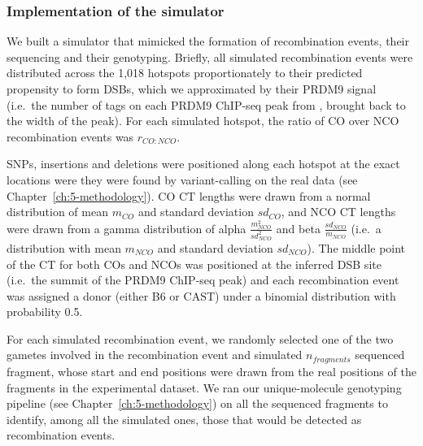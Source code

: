 


\subsubsection{Implementation of the simulator}
We built a simulator that mimicked the formation of recombination events, their sequencing and their genotyping.
Briefly, all simulated recombination events were distributed across the 1,018 hotspots proportionately to their predicted propensity to form DSBs, which we approximated by their PRDM9 signal (i.e.\ the number of tags on each PRDM9 ChIP-seq peak from \citet{baker2015prdm9}, brought back to the width of the peak).
For each simulated hotspot, the ratio of CO over NCO recombination events was $r_{CO:NCO}$.

SNPs, insertions and deletions were positioned along each hotspot at the exact locations were they were found by variant-calling on the real data (see Chapter~\ref{ch:5-methodology}). 
CO CT lengths were drawn from a normal distribution of mean $m_{CO}$ and standard deviation $sd_{CO}$, and NCO CT lengths were drawn from a gamma distribution of alpha $\frac{m_{NCO}^{2}}{sd_{NCO}^{2}}$ and beta $\frac{sd_{NCO}}{m_{NCO}}$ (i.e.\ a distribution with mean $m_{NCO}$ and standard deviation $sd_{NCO}$). 
The middle point of the CT for both COs and NCOs was positioned at the inferred DSB site (i.e.\ the summit of the PRDM9 ChIP-seq peak) and each recombination event was assigned a donor (either B6 or CAST) under a binomial distribution with probability 0.5.

For each simulated recombination event, we randomly selected one of the two gametes involved in the recombination event and simulated $n_{fragments}$ sequenced fragment, whose start and end positions were drawn from the real positions of the fragments in the experimental dataset. 
We ran our unique-molecule genotyping pipeline (see Chapter~\ref{ch:5-methodology}) on all the sequenced fragments to identify, among all the simulated ones, those that would be detected as recombination events.



